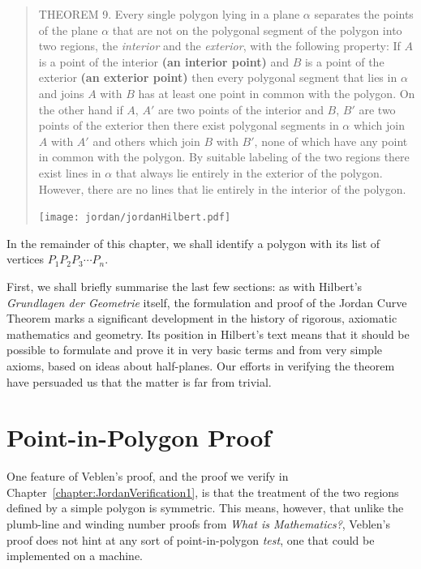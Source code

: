 \begin{quote}
  THEOREM 9. Every single polygon lying in a plane $\alpha$ separates the points of the plane $\alpha$ that are not on the polygonal segment of the polygon into two regions, the \emph{interior} and the \emph{exterior}, with the following property: If $A$ is a point of the interior {\bfseries (an interior point)} and $B$ is a point of the exterior {\bfseries (an exterior point)} then every polygonal segment that lies in $\alpha$ and joins $A$ with $B$ has at least one point in common with the polygon. On the other hand if $A$, $A'$ are two points of the interior and $B$, $B'$ are two points of the exterior then there exist polygonal segments in $\alpha$ which join $A$ with $A'$ and others which join $B$ with $B'$, none of which have any point in common with the polygon. By suitable labeling of the two regions there exist lines in $\alpha$ that always lie entirely in the exterior of the polygon. However, there are no lines that lie entirely in the interior of the polygon.

  \centering\texttt{[image: jordan/jordanHilbert.pdf]}
\end{quote}

In the remainder of this chapter, we shall identify a polygon with its list of vertices $P_1P_2P_3\cdots P_n$.

First, we shall briefly summarise the last few sections: as with Hilbert's \emph{Grundlagen der Geometrie} itself, the formulation and proof of the Jordan Curve Theorem marks a significant development in the history of rigorous, axiomatic mathematics and geometry. Its position in Hilbert's text means that it should be possible to formulate and prove it in very basic terms and from very simple axioms, based on ideas about half-planes. Our efforts in verifying the theorem have persuaded us that the matter is far from trivial.

\section{Point-in-Polygon Proof}\label{sec:JordanCurveFirstProof}
One feature of Veblen's proof, and the proof we verify in Chapter~\ref{chapter:JordanVerification1}, is that the treatment of the two regions defined by a simple polygon is symmetric. This means, however, that unlike the plumb-line and winding number proofs from \emph{What is Mathematics?}, Veblen's proof does not hint at any sort of point-in-polygon \emph{test}, one that could be implemented on a machine.

